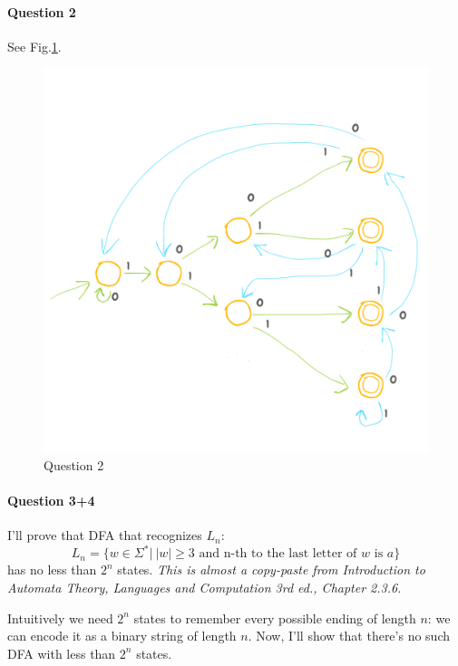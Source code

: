 \paragraph{Question 2}
See Fig.\ref{fig:w15-2}.
\begin{figure}[!h]
    \centering
    \includegraphics[scale=0.4]{data/2015-W-2.png}
    \caption{Question 2}
    \label{fig:w15-2}
\end{figure}



\paragraph{Question 3+4}
I'll prove that DFA that recognizes $L_n$:
\begin{equation*}
    L_n = \{ w\in \Sigma^* | \: |w| \geq 3  \text{ and n-th to the last letter of $w$ is $a$}\}
\end{equation*}
has no less than $2^n$ states. \textit{This is almost a copy-paste from \emph{Introduction to Automata Theory, Languages and Computation 3rd ed.}, Chapter 2.3.6}.

Intuitively we need $2^n$ states to remember every possible ending of length $n$: we can encode it as a binary string of length $n$.
Now, I'll show that there's no such DFA with less than $2^n$ states.


